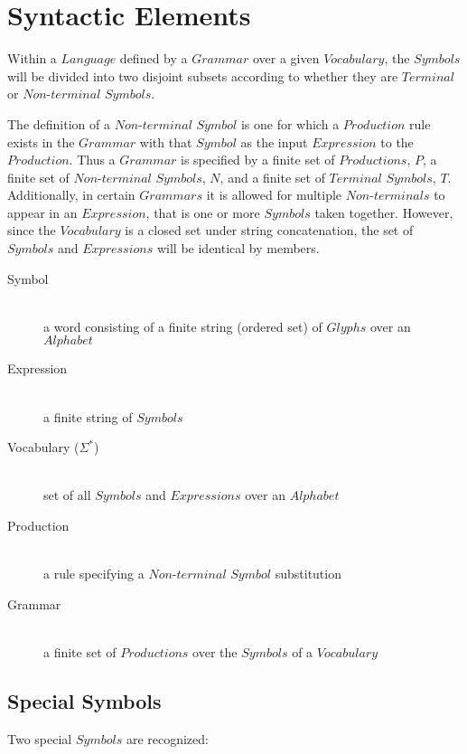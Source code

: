\documentclass{article}
\begin{document}
\section{Syntactic Elements}

Within a $Language$ defined by a $Grammar$ over a given $Vocabulary$,
the $Symbols$ will be divided into two disjoint subsets according to
whether they are $Terminal$ or $Non$-$terminal$ $Symbols$.

The definition of a $Non$-$terminal$ $Symbol$ is one for which a
$Production$ rule exists in the $Grammar$ with that $Symbol$ as the
input $Expression$ to the $Production$. Thus a $Grammar$ is specified
by a finite set of $Productions$, $P$, a finite set of
$Non$-$terminal$ $Symbols$, $N$, and a finite set of $Terminal$
$Symbols$, $T$. Additionally, in certain $Grammars$ it is allowed for
multiple $Non$-$terminals$ to appear in an $Expression$, that is one
or more $Symbols$ taken together. However, since the $Vocabulary$ is a
closed set under string concatenation, the set of $Symbols$ and
$Expressions$ will be identical by members.

    \begin{description}

    \item[Symbol] \hfill \\
    a word consisting of a finite string (ordered set) of $Glyphs$
    over an $Alphabet$

    \item[Expression] \hfill \\
    a finite string of $Symbols$

    \item[Vocabulary ($\Sigma^{*}$)] \hfill \\
    set of all $Symbols$ and $Expressions$ over an $Alphabet$

    \item[Production] \hfill \\
    a rule specifying a $Non$-$terminal$ $Symbol$ substitution

    \item[Grammar] \hfill \\
    a finite set of $Productions$ over the $Symbols$ of a $Vocabulary$

    \end{description}

\subsection{Special Symbols}
Two special $Symbols$ are recognized:
\end{document}
